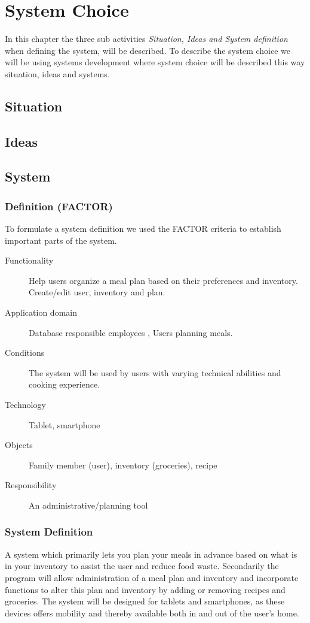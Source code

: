 \chapter{System Choice}
In this chapter the three sub activities \textit{Situation, Ideas and System definition} when defining the system, will be described. To describe the system choice we will be using systems development where system choice will be described this way situation, ideas and systems.

\section{Situation} \label{SituationLabel}


\section{Ideas}


\section{System}
\subsection{Definition (FACTOR)}
To formulate a system definition we used the FACTOR \cite{OOAD_BATOF} criteria to establish important parts of the system.

\begin{description}
	\item[Functionality] Help users organize a meal plan based on their preferences and inventory. Create/edit user, inventory and plan.
	\item[Application domain] Database responsible employees , Users planning meals.
	\item[Conditions] The system will be used by users with varying technical abilities and cooking experience.
	\item[Technology] Tablet, smartphone
	\item[Objects] Family member (user), inventory (groceries), recipe
	\item[Responsibility] An administrative/planning tool
\end{description}

\subsection{System Definition}
A system which primarily lets you plan your meals in advance based on what is in your inventory to assist the user and reduce food waste.
Secondarily the program will allow administration of a meal plan and inventory and incorporate functions to alter this plan and inventory by adding or removing recipes and groceries.
The system will be designed for tablets and smartphones, as these devices offers mobility and thereby available both in and out of the user's home.